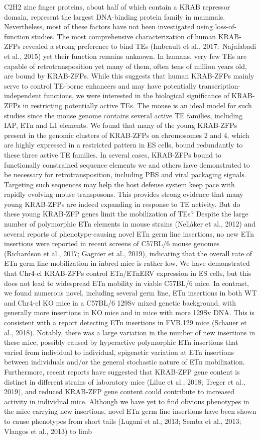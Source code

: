\documentclass[11pt,a4paper]{article}
\begin{document}
C2H2 zinc finger proteins, about half of which contain a KRAB repressor domain, represent the largest DNA-binding protein family in mammals. Nevertheless, most of these factors have not been investigated using loss-of-function studies. The most comprehensive characterization of human KRAB-ZFPs revealed a strong preference to bind TEs (Imbeault et al., 2017; Najafabadi et al., 2015) yet their function remains unknown. In humans, very few TEs are capable of retrotransposition yet many of them, often tens of million years old, are bound by KRAB-ZFPs. While this suggests that human KRAB-ZFPs mainly serve to control TE-borne enhancers and may have potentially transcription-independent functions, we were interested in the biological significance of KRAB-ZFPs in restricting potentially active TEs. The mouse is an ideal model for such studies since the mouse genome contains several active TE families, including IAP, ETn and L1 elements. We found that many of the young KRAB-ZFPs present in the genomic clusters of KRAB-ZFPs on chromosomes 2 and 4, which are highly expressed in a restricted pattern in ES cells, bound redundantly to these three active TE families. In several cases, KRAB-ZFPs bound to functionally constrained sequence elements we and others have demonstrated to be necessary for retrotransposition, including PBS and viral packaging signals. Targeting such sequences may help the host defense system keep pace with rapidly evolving mouse transposons. This provides strong evidence that many young KRAB-ZFPs are indeed expanding in response to TE activity. But do these young KRAB-ZFP genes limit the mobilization of TEs? Despite the large number of polymorphic ETn elements in mouse strains (Nellåker et al., 2012) and several reports of phenotype-causing novel ETn germ line insertions, no new ETn insertions were reported in recent screens of C57BL/6 mouse genomes (Richardson et al., 2017; Gagnier et al., 2019), indicating that the overall rate of ETn germ line mobilization in inbred mice is rather low. We have demonstrated that Chr4-cl KRAB-ZFPs control ETn/ETnERV expression in ES cells, but this does not lead to widespread ETn mobility in viable C57BL/6 mice. In contrast, we found numerous novel, including several germ line, ETn insertions in both WT and Chr4-cl KO mice in a C57BL/6 129Sv mixed genetic background, with generally more insertions in KO mice and in mice with more 129Sv DNA. This is consistent with a report detecting ETn insertions in FVB.129 mice (Schauer et al., 2018). Notably, there was a large variation in the number of new insertions in these mice, possibly caused by hyperactive polymorphic ETn insertions that varied from individual to individual, epigenetic variation at ETn insertions between individuals and/or the general stochastic nature of ETn mobilization. Furthermore, recent reports have suggested that KRAB-ZFP gene content is distinct in different strains of laboratory mice (Lilue et al., 2018; Treger et al., 2019), and reduced KRAB-ZFP gene content could contribute to increased activity in individual mice. Although we have yet to find obvious phenotypes in the mice carrying new insertions, novel ETn germ line insertions have been shown to cause phenotypes from short tails (Lugani et al., 2013; Semba et al., 2013; Vlangos et al., 2013) to limb 
\end{document}
